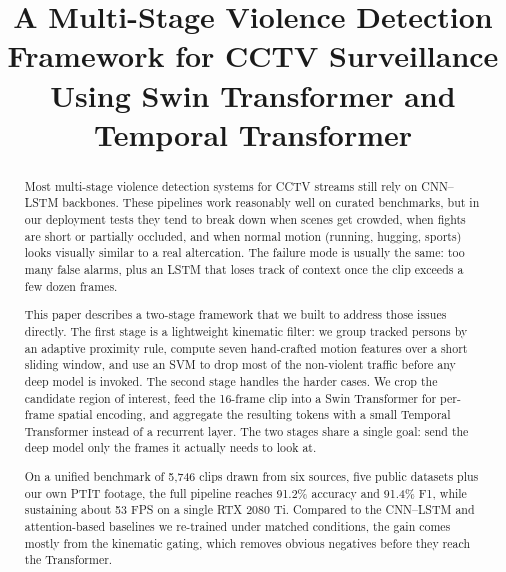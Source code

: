 \documentclass[conference]{IEEEtran}
\begin{document}
\title{A Multi-Stage Violence Detection Framework for CCTV Surveillance Using Swin Transformer and Temporal Transformer}

\author{
\IEEEauthorblockN{
}
}

\maketitle

\begin{abstract}
Most multi-stage violence detection systems for CCTV streams still rely on CNN–LSTM backbones. These pipelines work reasonably well on curated benchmarks, but in our deployment tests they tend to break down when scenes get crowded, when fights are short or partially occluded, and when normal motion (running, hugging, sports) looks visually similar to a real altercation. The failure mode is usually the same: too many false alarms, plus an LSTM that loses track of context once the clip exceeds a few dozen frames.

This paper describes a two-stage framework that we built to address those issues directly. The first stage is a lightweight kinematic filter: we group tracked persons by an adaptive proximity rule, compute seven hand-crafted motion features over a short sliding window, and use an SVM to drop most of the non-violent traffic before any deep model is invoked. The second stage handles the harder cases. We crop the candidate region of interest, feed the 16-frame clip into a Swin Transformer for per-frame spatial encoding, and aggregate the resulting tokens with a small Temporal Transformer instead of a recurrent layer. The two stages share a single goal: send the deep model only the frames it actually needs to look at.

On a unified benchmark of 5,746 clips drawn from six sources, five public datasets plus our own PTIT footage, the full pipeline reaches 91.2\% accuracy and 91.4\% F1, while sustaining about 53 FPS on a single RTX 2080 Ti. Compared to the CNN–LSTM and attention-based baselines we re-trained under matched conditions, the gain comes mostly from the kinematic gating, which removes obvious negatives before they reach the Transformer.
\end{abstract}
\end{document}
